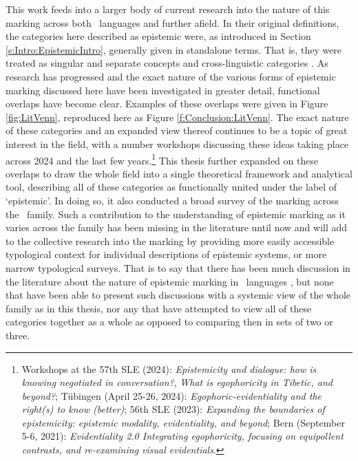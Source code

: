 This work feeds into a larger body of current research into the nature of this marking across both \lfam\ languages and further afield. In their original definitions, the categories here described as epistemic were, as introduced in Section \ref{s:Intro:EpistemicIntro}, generally given in standalone terms. That is, they were treated as singular and separate concepts and cross-linguistic categories \cites{ChafeNichols1986}{DeLanceyMirativity1997}{Tournadre1992}{EvansBergqvistSanRoque2018a}. As research has progressed and the exact nature of the various forms of epistemic marking discussed here have been investigated in greater detail, functional overlaps have become clear. Examples of these overlaps were given in Figure \ref{fig:LitVenn}, reproduced here as Figure \ref{f:Conclusion:LitVenn}. The exact nature of these categories and an expanded view thereof continues to be a topic of great interest in the field, with a number workshops discussing these ideas taking place across 2024 and the last few years.\footnote{Workshops at the 57th SLE (2024): \textit{Epistemicity and dialogue: how is knowing negotiated in conversation?}, \textit{What is egophoricity in Tibetic, and beyond?}; Tübingen (April 25-26, 2024): \textit{Egophoric-evidentiality and the right(s) to know (better)}; 56th SLE (2023): \textit{Expanding the boundaries of epistemicity: epistemic modality, evidentiality, and beyond}; Bern (September 5-6, 2021): \textit{Evidentiality 2.0 Integrating egophoricity, focusing on equipollent contrasts, and re-examining visual evidentials}.} This thesis further expanded on these overlaps to draw the whole field into a single theoretical framework and analytical tool, describing all of these categories as functionally united under the label of `epistemic'. In doing so, it also conducted a broad survey of the marking across the \lfam\ family. Such a contribution to the understanding of epistemic marking as it varies across the family has been missing in the literature until now and will add to the collective research into the marking by providing more easily accessible typological context for individual descriptions of epistemic systems, or more narrow typological surveys. That is to say that there has been much discussion in the literature about the nature of epistemic marking in \lfam\ languages \cites{Bergqvist2020a}{DeLancey2012}{Gawne2017}{HengeveldOlbertz2012}{Hill2012}{Hyslop2014}{Hyslop2018}{Widmer2017}{Widmer2020}, but none that have been able to present such discussions with a systemic view of the whole family as in this thesis, nor any that have attempted to view all of these categories together as a whole as opposed to comparing then in sets of two or three.

